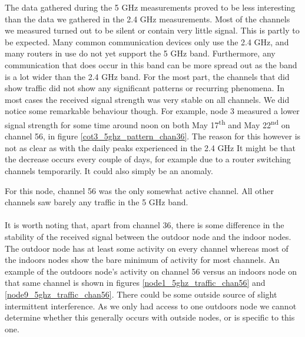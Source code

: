 \documentclass[a4paper, 11pt]{article}
\begin{document}
The data gathered during the 5 GHz measurements proved to be less interesting than the data we gathered in the 2.4 GHz measurements. Most of the channels we measured turned out to be silent or contain very little signal. This is partly to be expected. Many common communication devices only use the 2.4 GHz, and many routers in use do not yet support the 5 GHz band. Furthermore, any communication that does occur in this band can be more spread out as the band is a lot wider than the 2.4 GHz band. For the most part, the channels that did show traffic did not show any significant patterns or recurring phenomena. In most cases the received signal strength was very stable on all channels. We did notice some remarkable behaviour though. For example, node 3 measured a lower signal strength for some time around noon on both May 17\textsuperscript{th} and May 22\textsuperscript{nd} on channel 56, in figure \ref{cot3_5ghz_pattern_chan36}. The reason for this however is not as clear as with the daily peaks experienced in the 2.4 GHz It might be that the decrease occurs every couple of days, for example due to a router switching channels temporarily. It could also simply be an anomaly.

For this node, channel 56 was the only somewhat active channel. All other channels saw barely any traffic in the 5 GHz band. \\\\
It is worth noting that, apart from channel 36, there is some difference in the stability of the received signal between the outdoor node and the indoor nodes. The outdoor node has at least some activity on every channel whereas most of the indoors nodes show the bare minimum of activity for most channels. An example of the outdoors node's activity on channel 56 versus an indoors node on that same channel is shown in figures \ref{node1_5ghz_traffic_chan56} and \ref{node9_5ghz_traffic_chan56}. There could be some outside source of slight intermittent interference. As we only had access to one outdoors node we cannot determine whether this generally occurs with outside nodes, or is specific to this one.
\end{document}
